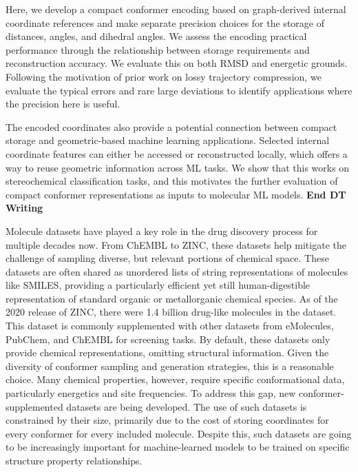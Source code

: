 \documentclass[%
 preprint,
superscriptaddress,
 amsmath,amssymb,
 aip,
 jcp,
]{revtex4-2}
\begin{document}
Here, we develop a compact conformer encoding based on graph-derived internal coordinate references and make separate precision choices for the storage of distances, angles, and dihedral angles. We assess the encoding practical performance through the relationship between storage requirements and reconstruction accuracy. We evaluate this on both RMSD and energetic grounds. Following the motivation of prior work on lossy trajectory compression, we evaluate the typical errors and rare large deviations to identify applications where the precision here is useful. 

The encoded coordinates also provide a potential connection between compact storage and geometric-based machine learning applications. Selected internal coordinate features can either be accessed or reconstructed locally, which offers a way to reuse geometric information across ML tasks. We show that this works on stereochemical classification tasks, and this motivates the further evaluation of compact conformer representations as inputs to molecular ML models. 
\textbf{End DT Writing}


Molecule datasets have played a key role in the drug discovery process for multiple decades now.
From ChEMBL to ZINC, these datasets help mitigate the challenge of sampling diverse, but relevant portions of chemical space.\cite{ChemBL,ZINC}
These datasets are often shared as unordered lists of string representations of molecules like SMILES, providing a particularly efficient yet still human-digestible representation of standard organic or metallorganic chemical species.\cite{Weininger1988SMILES,Weininger1989CanonicalSMILES,Krenn2020SELFIES}
As of the 2020 release of ZINC, there were 1.4 billion drug-like molecules in the dataset.
This dataset is commonly supplemented with other datasets from eMolecules, PubChem, and ChEMBL for screening tasks.
By default, these datasets only provide chemical representations, omitting structural information.
Given the diversity of conformer sampling and generation strategies, this is a reasonable choice.
Many chemical properties, however, require specific conformational data, particularly energetics and site frequencies.
To address this gap, new conformer-supplemented datasets are being developed.\cite{GEOM}
The use of such datasets is constrained by their size, primarily due to the cost of storing coordinates for every conformer for every included molecule.
Despite this, such datasets are going to be increasingly important for machine-learned models to be trained on specific structure property relationships.
\end{document}
